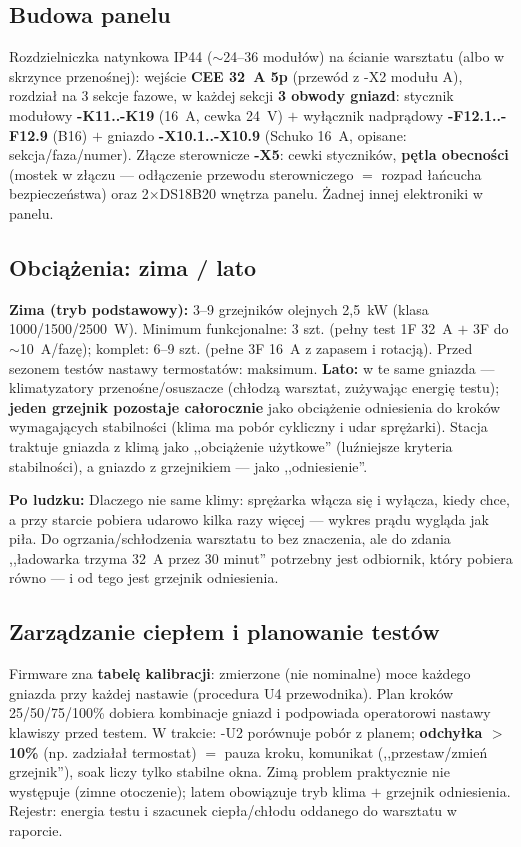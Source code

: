 \documentclass[11pt,a4paper]{article}
\newcommand{\why}[1]{\par\smallskip\noindent\colorbox{blue!6}{\parbox{0.965\linewidth}{\small\textbf{Po ludzku:} #1}}\par\smallskip}
\begin{document}
\subsection{Budowa panelu}
Rozdzielniczka natynkowa IP44 ($\sim$24--36 modułów) na ścianie warsztatu (albo w skrzynce
przenośnej): wejście \textbf{CEE 32~A 5p} (przewód z -X2 modułu A), rozdział na 3 sekcje fazowe,
w każdej sekcji \textbf{3 obwody gniazd}: stycznik modułowy \textbf{-K11..-K19} (16~A, cewka 24~V)
$+$ wyłącznik nadprądowy \textbf{-F12.1..-F12.9} (B16) $+$ gniazdo \textbf{-X10.1..-X10.9}
(Schuko 16~A, opisane: sekcja/faza/numer). Złącze sterownicze \textbf{-X5}: cewki styczników,
\textbf{pętla obecności} (mostek w złączu --- odłączenie przewodu sterowniczego $=$ rozpad
łańcucha bezpieczeństwa) oraz 2$\times$DS18B20 wnętrza panelu. Żadnej innej elektroniki w panelu.
\subsection{Obciążenia: zima / lato}
\label{sec:lato}
\textbf{Zima (tryb podstawowy):} 3--9 grzejników olejnych 2,5~kW (klasa 1000/1500/2500~W).
Minimum funkcjonalne: 3 szt. (pełny test 1F 32~A $+$ 3F do $\sim$10~A/fazę); komplet: 6--9 szt.
(pełne 3F 16~A z zapasem i rotacją). Przed sezonem testów nastawy termostatów: maksimum.
\textbf{Lato:} w te same gniazda --- klimatyzatory przenośne/osuszacze (chłodzą warsztat,
zużywając energię testu); \textbf{jeden grzejnik pozostaje całorocznie} jako obciążenie
odniesienia do kroków wymagających stabilności (klima ma pobór cykliczny i udar sprężarki).
Stacja traktuje gniazda z klimą jako ,,obciążenie użytkowe'' (luźniejsze kryteria stabilności),
a gniazdo z grzejnikiem --- jako ,,odniesienie''.
\why{Dlaczego nie same klimy: sprężarka włącza się i wyłącza, kiedy chce, a przy starcie pobiera
udarowo kilka razy więcej --- wykres prądu wygląda jak piła. Do ogrzania/schłodzenia warsztatu
to bez znaczenia, ale do zdania ,,ładowarka trzyma 32~A przez 30 minut'' potrzebny jest odbiornik,
który pobiera równo --- i od tego jest grzejnik odniesienia.}
\subsection{Zarządzanie ciepłem i planowanie testów}
\label{sec:cieplo}
Firmware zna \textbf{tabelę kalibracji}: zmierzone (nie nominalne) moce każdego gniazda przy
każdej nastawie (procedura U4 przewodnika). Plan kroków 25/50/75/100\% dobiera kombinacje gniazd
i podpowiada operatorowi nastawy klawiszy przed testem. W trakcie: -U2 porównuje pobór z planem;
\textbf{odchyłka $>$10\%} (np. zadziałał termostat) $=$ pauza kroku, komunikat (,,przestaw/zmień
grzejnik''), soak liczy tylko stabilne okna. Zimą problem praktycznie nie występuje (zimne
otoczenie); latem obowiązuje tryb klima $+$ grzejnik odniesienia. Rejestr: energia testu
i szacunek ciepła/chłodu oddanego do warsztatu w raporcie.
\end{document}
